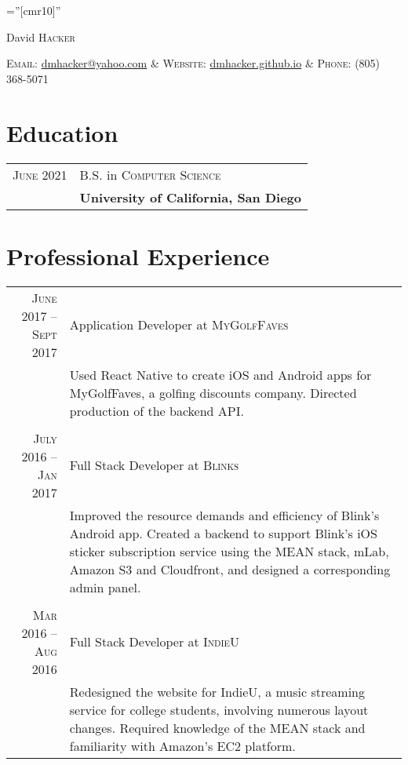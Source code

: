 \documentclass[a4paper,10pt]{article}
\begin{document}
\pagestyle{empty} %

\font\fb=''[cmr10]'' %

\par{\centering
	{
		\Huge David \textsc{Hacker}
	}
\bigskip\par}

\par{\centering
	{
		\textsc{Email:} \href{mailto:dmhacker@yahoo.com}{dmhacker@yahoo.com} &
		\textsc{Website:} \href{dmhacker.github.io}{dmhacker.github.io} &
		\textsc{Phone:} (805) 368-5071
	}
\bigskip\par}


\section{Education}
\begin{tabular}{rl}
\textsc{June} 2021 & B.S. in \textsc{Computer Science} \\ 
	& \normalsize\textbf{University of California, San Diego}
\end{tabular}

\section{Professional Experience}
\begin{tabular}{r|p{11cm}}

\textsc{June 2017 – Sept 2017} & Application Developer at \textsc{MyGolfFaves} \\
&\footnotesize{Used React Native to create iOS and Android apps for MyGolfFaves, a golfing discounts company. Directed production of the backend API.} \\
\multicolumn{2}{c}{} \\
\textsc{July 2016 – Jan 2017} & Full Stack Developer at \textsc{Blinks} \\
&\footnotesize{Improved the resource demands and efficiency of Blink’s Android app. Created a backend to support Blink’s iOS sticker subscription service using the MEAN stack, mLab, Amazon S3 and Cloudfront, and designed a corresponding admin panel.} \\
\multicolumn{2}{c}{} \\
\textsc{Mar 2016 – Aug 2016} & Full Stack Developer at \textsc{IndieU} \\
&\footnotesize{Redesigned the website for IndieU, a music streaming service for college students, involving numerous layout changes. Required knowledge of the MEAN stack and familiarity with Amazon's EC2 platform.}
\end{tabular}
\end{document}
